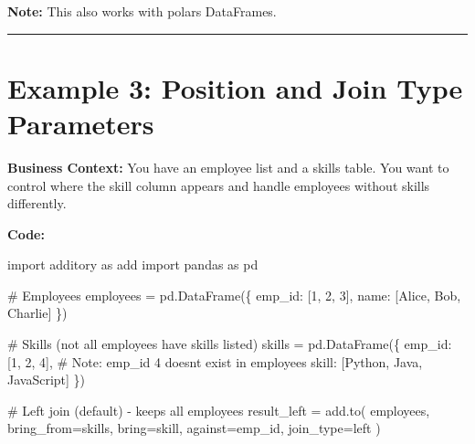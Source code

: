 \documentclass[
  letterpaper,
]{scrbook}
\newenvironment{Shaded}{\begin{snugshade}}{\end{snugshade}}
\newcommand{\CommentTok}[1]{\textcolor[rgb]{0.37,0.37,0.37}{#1}}
\newcommand{\DecValTok}[1]{\textcolor[rgb]{0.68,0.00,0.00}{#1}}
\newcommand{\ImportTok}[1]{\textcolor[rgb]{0.00,0.46,0.62}{#1}}
\newcommand{\NormalTok}[1]{\textcolor[rgb]{0.00,0.23,0.31}{#1}}
\newcommand{\OperatorTok}[1]{\textcolor[rgb]{0.37,0.37,0.37}{#1}}
\newcommand{\StringTok}[1]{\textcolor[rgb]{0.13,0.47,0.30}{#1}}
\begin{document}
\textbf{Note:} This also works with polars DataFrames.

\begin{center}\rule{0.5\linewidth}{0.5pt}\end{center}

\section{Example 3: Position and Join Type
Parameters}\label{example-3-position-and-join-type-parameters}

\textbf{Business Context:} You have an employee list and a skills table.
You want to control where the skill column appears and handle employees
without skills differently.

\textbf{Code:}

\begin{Shaded}
\begin{Highlighting}[]
\ImportTok{import}\NormalTok{ additory }\ImportTok{as}\NormalTok{ add}
\ImportTok{import}\NormalTok{ pandas }\ImportTok{as}\NormalTok{ pd}

\CommentTok{\# Employees}
\NormalTok{employees }\OperatorTok{=}\NormalTok{ pd.DataFrame(\{}
    \StringTok{\textquotesingle{}emp\_id\textquotesingle{}}\NormalTok{: [}\DecValTok{1}\NormalTok{, }\DecValTok{2}\NormalTok{, }\DecValTok{3}\NormalTok{],}
    \StringTok{\textquotesingle{}name\textquotesingle{}}\NormalTok{: [}\StringTok{\textquotesingle{}Alice\textquotesingle{}}\NormalTok{, }\StringTok{\textquotesingle{}Bob\textquotesingle{}}\NormalTok{, }\StringTok{\textquotesingle{}Charlie\textquotesingle{}}\NormalTok{]}
\NormalTok{\})}

\CommentTok{\# Skills (not all employees have skills listed)}
\NormalTok{skills }\OperatorTok{=}\NormalTok{ pd.DataFrame(\{}
    \StringTok{\textquotesingle{}emp\_id\textquotesingle{}}\NormalTok{: [}\DecValTok{1}\NormalTok{, }\DecValTok{2}\NormalTok{, }\DecValTok{4}\NormalTok{],  }\CommentTok{\# Note: emp\_id 4 doesn\textquotesingle{}t exist in employees}
    \StringTok{\textquotesingle{}skill\textquotesingle{}}\NormalTok{: [}\StringTok{\textquotesingle{}Python\textquotesingle{}}\NormalTok{, }\StringTok{\textquotesingle{}Java\textquotesingle{}}\NormalTok{, }\StringTok{\textquotesingle{}JavaScript\textquotesingle{}}\NormalTok{]}
\NormalTok{\})}

\CommentTok{\# Left join (default) {-} keeps all employees}
\NormalTok{result\_left }\OperatorTok{=}\NormalTok{ add.to(}
\NormalTok{    employees,}
\NormalTok{    bring\_from}\OperatorTok{=}\NormalTok{skills,}
\NormalTok{    bring}\OperatorTok{=}\StringTok{\textquotesingle{}skill\textquotesingle{}}\NormalTok{,}
\NormalTok{    against}\OperatorTok{=}\StringTok{\textquotesingle{}emp\_id\textquotesingle{}}\NormalTok{,}
\NormalTok{    join\_type}\OperatorTok{=}\StringTok{\textquotesingle{}left\textquotesingle{}}
\NormalTok{)}


\end{Highlighting}
\end{Shaded}
\end{document}

